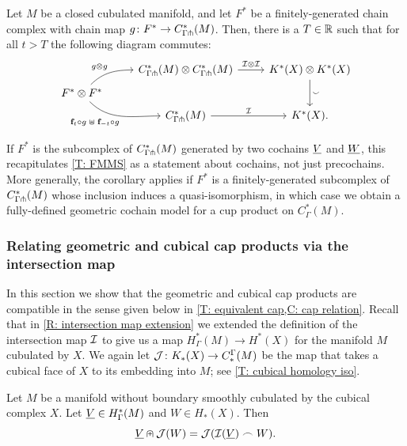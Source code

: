 \begin{corollary}
	Let $M$ be a closed cubulated manifold, and let $F^*$ be a finitely-generated chain complex with chain map $g \colon F^*\to C^*_{\Gamma \pitchfork}(M)$.
	Then, there is a $T \in \mathbb{R}$ such that for all $t > T$ the following diagram commutes:
	\[
	\begin{tikzcd} [row sep=tiny]
		& C^*_{\Gamma \pf}(M) \otimes C^*_{\Gamma \pf}(M) \arrow[r, "\mc I \otimes \mc I"] & K^*(X) \otimes K^*(X) \arrow[dd, "\sms"] \\
		F^*\otimes F^* \arrow[ur, in=180, out=45,"g\otimes g"] \arrow[dr, in=180, out=-45, "\f_t \circ g \; \uplus \; \f_{-t} \circ g"']& & \\
		& C^*_{\Gamma \pf}(M) \arrow[r, "\mc I"] & K^*(X).
	\end{tikzcd}
	\]
\end{corollary}

If $F^*$ is the subcomplex of $C^*_{\Gamma \pitchfork}(M)$ generated by two cochains $\underline{V}$ and $\underline{W}$, this recapitulates \cref{T: FMMS} as a statement about cochains, not just precochains.
More generally, the corollary applies if $F^*$ is a finitely-generated subcomplex of $C^*_{\Gamma \pitchfork}(M)$ whose inclusion induces a quasi-isomorphism, in which case we obtain a fully-defined geometric cochain model for a cup product on $C^*_\Gamma(M)$.



\subsubsection{Relating geometric and cubical cap products via the intersection map}\label{S: cap product via intersection}

In this section we show that the geometric and cubical cap products are compatible in the sense given below in \cref{T: equivalent cap,C: cap relation}.
Recall that in \cref{R: intersection map extension} we extended the definition of the intersection map $\mathcal{I}$ to give us a map $H^*_\Gamma(M) \to H^*(X)$ for the manifold $M$ cubulated by $X$.
We again let $\mathcal{J} \colon K_*(X) \to C^\Gamma_*(M)$ be the map that takes a cubical face of $X$ to its embedding into $M$; see \cref{T: cubical homology iso}.

\begin{theorem}\label{T: equivalent cap}
	Let $M$ be a manifold without boundary smoothly cubulated by the cubical complex $X$.
	Let $\underline{V} \in H^*_\Gamma(M)$ and $W \in H_*(X )$.
	Then
	$$\underline{V} \nplus \mathcal{J}(W) = \mathcal{J}(\mathcal{I}(\underline{V})\frown W).$$
\end{theorem}

